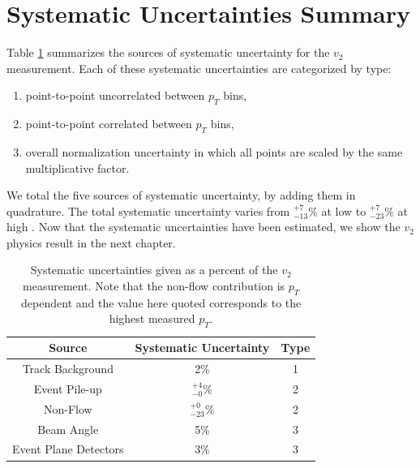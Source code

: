 \section{Systematic Uncertainties Summary}
Table \ref{tbl:sys_uncert} summarizes the sources of systematic uncertainty for the $v_2$ measurement. Each of these systematic uncertainties are categorized by type:
\begin{enumerate}
\item point-to-point uncorrelated between $p_T$ bins,
\item point-to-point correlated between $p_T$ bins,
\item overall normalization uncertainty in which all points are scaled by the same multiplicative factor.
\end{enumerate}
We total the five sources of systematic uncertainty, by adding them in quadrature. The total systematic uncertainty varies from $^{+7}_{-13}\%$ at low \pt to $^{+7}_{-23}\%$ at high \pt. Now that the systematic uncertainties have been estimated, we show the $v_2$ physics result in the next chapter.

\begin{table}[!h]
  \begin{center}
  \caption{\label{t:sys}Systematic uncertainties given as a percent of the $v_2$ measurement. Note that the non-flow contribution is $p_T$ dependent and the value here quoted corresponds to the highest measured $p_T$.}
    \begin{tabular}{ccc}
      \hline
      \hline
      Source& Systematic Uncertainty & Type \\ \hline
      Track Background &2\%& 1\\ 
      Event Pile-up    &$^{+4}_{-0}\%$& 2\\
      Non-Flow    &$^{+0}_{-23}\%$& 2\\
      Beam Angle &5\%& 3\\  
      Event Plane Detectors & 3\% & 3\\
    \hline
    \hline
    \end{tabular}
   \end{center}
   \label{tbl:sys_uncert}
 \end{table}



